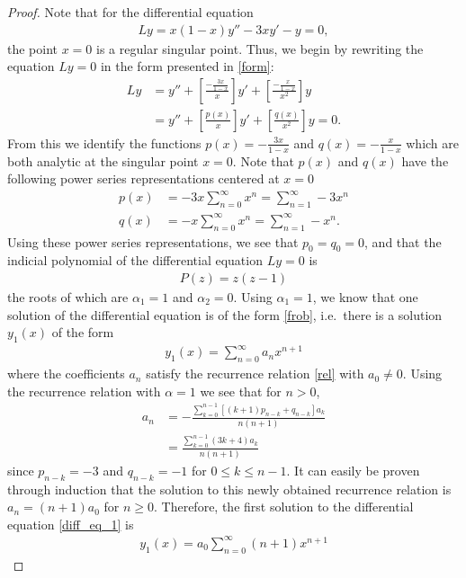 \documentclass[12pt]{article}
\theoremstyle{definition}
\begin{document}
\begin{proof}
  Note that for the differential equation
  \begin{align}\label{diff_eq_1}
    Ly = x(1-x)y'' - 3xy'-y = 0,
  \end{align}
  the point $x=0$ is a regular singular point. Thus, we begin by rewriting the equation $Ly=0$
  in the form presented in \eqref{form}:
  \begin{align*}
    Ly &= y'' + \left[\frac{-\frac{3x}{1-x}}{x}\right]y' + \left[\frac{-\frac{x}{1-x}}{x^2}\right]y \\
    &= y'' + \left[\frac{p(x)}{x}\right]y' + \left[\frac{q(x)}{x^2}\right]y = 0.
  \end{align*}
  From this we identify the functions $p(x) = -\frac{3x}{1-x}$ and $q(x) = -\frac{x}{1-x}$ which are
  both analytic at the singular point $x=0$. Note that
  $p(x)$ and $q(x)$ have the following power series representations centered at $x=0$
  \begin{align*}
    p(x) &= -3x\sum_{n=0}^\infty x^n = \sum_{n=1}^\infty -3 x^{n} \\
    q(x) &= -x\sum_{n=0}^\infty x^n = \sum_{n=1}^\infty - x^{n}.
  \end{align*}
  Using these power series representations, we see that $p_0 = q_0 = 0$, and that the indicial polynomial of
  the differential equation $Ly=0$ is
  \begin{align*}
    P(z) = z(z-1)
  \end{align*}
  the roots of which are $\alpha_1 = 1$ and $\alpha_2 = 0$. Using $\alpha_1 = 1$, we know that one solution of
  the differential equation is of the form \eqref{frob}, i.e.\ there is a solution $y_1(x)$ of the form
  \begin{align*}
    y_1(x) = \sum_{n=0}^\infty a_n x^{n+1}
  \end{align*}
  where the coefficients $a_n$ satisfy the recurrence relation \eqref{rel} with $a_0 \neq 0$. Using the recurrence relation with $\alpha = 1$ we see that for $n>0$,
  \begin{align*}
    a_n &= -\frac{\sum_{k=0}^{n-1} [(k+1)p_{n-k} + q_{n-k}]a_k}{n(n+1)} \\
    &= \frac{\sum_{k=0}^{n-1} (3k + 4)a_k}{n(n+1)}
  \end{align*}
  since $p_{n-k} = -3$ and $q_{n-k} = -1$ for $0\leq k \leq n-1$. It can easily be proven through induction that the solution to this newly obtained recurrence
  relation is $a_n = (n+1)a_0$ for $n\geq0$. Therefore, the first solution to the differential equation \eqref{diff_eq_1} is
  \begin{align*}
    y_1(x) = a_0 \sum_{n=0}^\infty (n+1)x^{n+1}
  \end{align*}


\end{proof}
\end{document}
